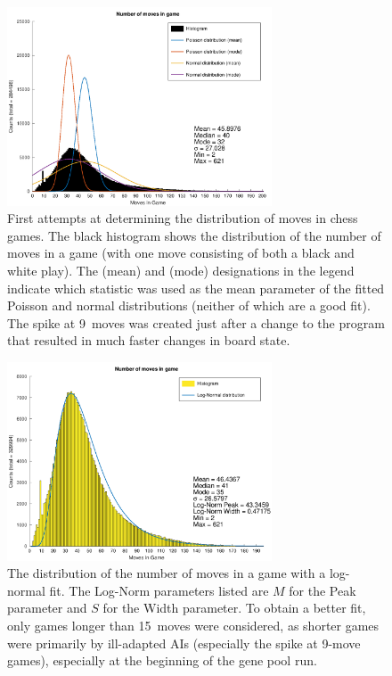 \documentclass[letterpaper]{article}
\renewcommand{\_}{\allowbreak\textunderscore\allowbreak}
\begin{document}
\begin{figure}[tbh]
	\centering
	\includegraphics[width=0.7\textwidth]{game_length_distribution.png}
	\caption{First attempts at determining the distribution of moves in chess games. The black histogram shows the distribution of the number of moves in a game (with one move consisting of both a black and white play). The (mean) and (mode) designations in the legend indicate which statistic was used as the mean parameter of the fitted Poisson and normal distributions (neither of which are a good fit). The spike at 9~moves was created just after a change to the program that resulted in much faster changes in board state.}\label{game-length-plot}
\end{figure}

\begin{figure}[tbh]
	\centering
	\includegraphics[width=0.7\textwidth]{game_length_log_norm_distribution.png}
	\caption{The distribution of the number of moves in a game with a log-normal fit. The Log-Norm parameters listed are \(M\) for the Peak parameter and \(S\) for the Width parameter. To obtain a better fit, only games longer than 15~moves were considered, as shorter games were primarily by ill-adapted AIs (especially the spike at 9-move games), especially at the beginning of the gene pool run.}\label{log-norm-plot}
\end{figure}
\end{document}
